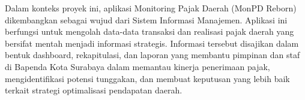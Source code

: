 Dalam konteks proyek ini, aplikasi Monitoring Pajak Daerah (MonPD Reborn) dikembangkan sebagai wujud dari Sistem Informasi Manajemen. Aplikasi ini berfungsi untuk mengolah data-data transaksi dan realisasi pajak daerah yang bersifat mentah menjadi informasi strategis. Informasi tersebut disajikan dalam bentuk dashboard, rekapitulasi, dan laporan yang membantu pimpinan dan staf di Bapenda Kota Surabaya dalam memantau kinerja penerimaan pajak, mengidentifikasi potensi tunggakan, dan membuat keputusan yang lebih baik terkait strategi optimalisasi pendapatan daerah.
